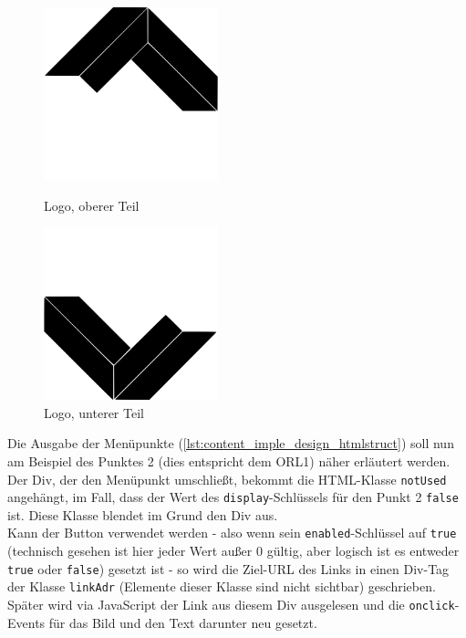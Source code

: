 \begin{figure}[H]
	\centering
	\begin{minipage}{7cm}
		\centering
		\includegraphics[keepaspectratio=true, height=5cm]{images/logo-up.png}
		\caption{Logo, oberer Teil}
		\label{fig:content_impl_design_logo-up}
	\end{minipage}
	\hspace{1cm}
	\begin{minipage}{7cm}
		\centering
		\includegraphics[keepaspectratio=true, height=5cm]{images/logo-down.png}
		\caption{Logo, unterer Teil}
		\label{fig:content_impl_design_logo-down}
	\end{minipage}
\end{figure}
Die Ausgabe der Menüpunkte (\autoref{lst:content_imple_design_htmlstruct}) soll nun am Beispiel des Punktes 2 (dies entspricht dem ORL1) näher erläutert werden.\\

Der Div, der den Menüpunkt umschließt, bekommt die HTML-Klasse \texttt{notUsed} angehängt, im Fall, dass der Wert des \texttt{display}-Schlüssels für den Punkt 2 \texttt{false} ist. Diese Klasse blendet im Grund den Div aus.\\
Kann der Button verwendet werden - also wenn sein \texttt{enabled}-Schlüssel auf \texttt{true} (technisch gesehen ist hier jeder Wert außer 0 gültig, aber logisch ist es entweder \texttt{true} oder \texttt{false}) gesetzt ist - so wird die Ziel-URL des Links in einen Div-Tag der Klasse \texttt{linkAdr} (Elemente dieser Klasse sind nicht sichtbar) geschrieben. Später wird via JavaScript der Link aus diesem Div ausgelesen und die \texttt{onclick}-Events für das Bild und den Text darunter neu gesetzt.\\
